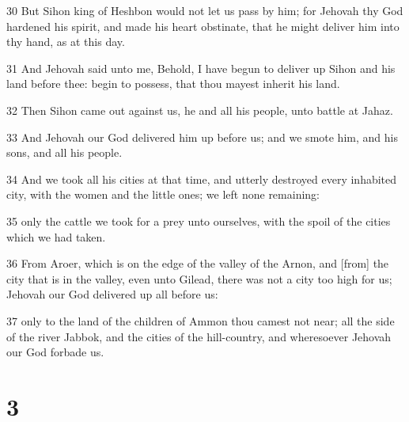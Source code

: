 \par 30 But Sihon king of Heshbon would not let us pass by him; for Jehovah thy God hardened his spirit, and made his heart obstinate, that he might deliver him into thy hand, as at this day.
\par 31 And Jehovah said unto me, Behold, I have begun to deliver up Sihon and his land before thee: begin to possess, that thou mayest inherit his land.
\par 32 Then Sihon came out against us, he and all his people, unto battle at Jahaz.
\par 33 And Jehovah our God delivered him up before us; and we smote him, and his sons, and all his people.
\par 34 And we took all his cities at that time, and utterly destroyed every inhabited city, with the women and the little ones; we left none remaining:
\par 35 only the cattle we took for a prey unto ourselves, with the spoil of the cities which we had taken.
\par 36 From Aroer, which is on the edge of the valley of the Arnon, and [from] the city that is in the valley, even unto Gilead, there was not a city too high for us; Jehovah our God delivered up all before us:
\par 37 only to the land of the children of Ammon thou camest not near; all the side of the river Jabbok, and the cities of the hill-country, and wheresoever Jehovah our God forbade us.

\chapter{3}

